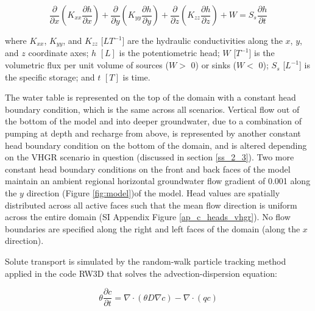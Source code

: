\begin{equation}
    \frac{\partial{}}{\partial{x}}(K_{xx} \frac{\partial{h}}{\partial{x}}) +
    \frac{\partial{}}{\partial{y}}(K_{yy} \frac{\partial{h}}{\partial{y}}) +
    \frac{\partial{}}{\partial{z}}(K_{zz} \frac{\partial{h}}{\partial{z}}) +
    W = S_s \frac{\partial{h}}{\partial{t}}
\label{eq:gwflow}
\end{equation}

where $K_{xx}$, $K_{yy}$, and $K_{zz}$ [$LT^{-1}$] are the hydraulic conductivities along the $x$, $y$, and $z$ coordinate axes; $h$ $[L]$ is the potentiometric head; $W$ [$T^{-1}$] is the volumetric flux per unit volume of sources ($W >$ 0) or sinks ($W <$ 0); $S_s$ [$L^{-1}$] is the specific storage; and $t$ $[T]$ is time. 

The water table is represented on the top of the domain with a constant head boundary condition, which is the same across all scenarios. Vertical flow out of the bottom of the model and into deeper groundwater, due to a combination of pumping at depth and recharge from above, is represented by another constant head boundary condition on the bottom of the domain, and is altered depending on the VHGR scenario in question (discussed in section \ref{ss_2_3}). Two more constant head boundary conditions on the front and back faces of the model maintain an ambient regional horizontal groundwater flow gradient of 0.001 along the $y$ direction (Figure \ref{fig:model})of the model. Head values are spatially distributed across all active faces such that the mean flow direction is uniform across the entire domain (SI Appendix Figure \ref{ap_c_heads_vhgr}). No flow boundaries are specified along the right and left faces of the domain (along the $x$ direction). 



Solute transport is simulated by the random‐walk particle tracking method \citep{labolle1998diffusion, labolle2000diffusion} applied in the code RW3D \citep{fernandez2005differences, henri2014toward, henri2015random, salamon2006modeling} that solves the advection-dispersion equation: 

\begin{equation}
    \theta \frac{\partial{c}}{\partial{t}} = \nabla \cdot (\theta D \nabla c) - \nabla \cdot (qc)
\label{eq:ade}
\end{equation}


